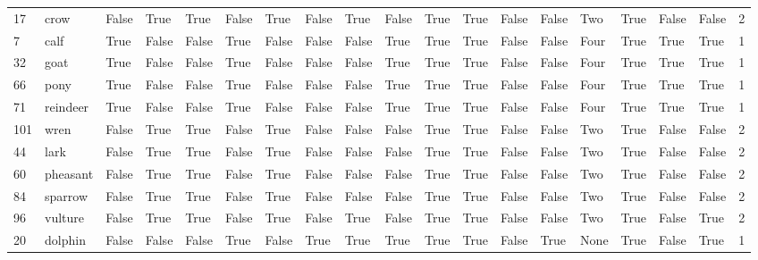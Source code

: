 \begin{tabular}{llllllllllllllllllr}
17  &        crow &  False &      True &   True &  False &      True &    False &      True &    False &      True &      True &     False &  False &    Two &   True &     False &    False &           2 \\
7   &        calf &   True &     False &  False &   True &     False &    False &     False &     True &      True &      True &     False &  False &   Four &   True &      True &     True &           1 \\
32  &        goat &   True &     False &  False &   True &     False &    False &     False &     True &      True &      True &     False &  False &   Four &   True &      True &     True &           1 \\
66  &        pony &   True &     False &  False &   True &     False &    False &     False &     True &      True &      True &     False &  False &   Four &   True &      True &     True &           1 \\
71  &    reindeer &   True &     False &  False &   True &     False &    False &     False &     True &      True &      True &     False &  False &   Four &   True &      True &     True &           1 \\
101 &        wren &  False &      True &   True &  False &      True &    False &     False &    False &      True &      True &     False &  False &    Two &   True &     False &    False &           2 \\
44  &        lark &  False &      True &   True &  False &      True &    False &     False &    False &      True &      True &     False &  False &    Two &   True &     False &    False &           2 \\
60  &    pheasant &  False &      True &   True &  False &      True &    False &     False &    False &      True &      True &     False &  False &    Two &   True &     False &    False &           2 \\
84  &     sparrow &  False &      True &   True &  False &      True &    False &     False &    False &      True &      True &     False &  False &    Two &   True &     False &    False &           2 \\
96  &     vulture &  False &      True &   True &  False &      True &    False &      True &    False &      True &      True &     False &  False &    Two &   True &     False &     True &           2 \\
20  &     dolphin &  False &     False &  False &   True &     False &     True &      True &     True &      True &      True &     False &   True &   None &   True &     False &     True &           1 \\

\end{tabular}
